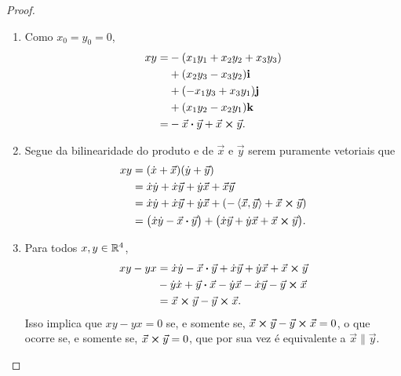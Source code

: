 \begin{proof}
\begin{enumerate}
	\item Como $x_0=y_0=0$,
	\begin{align*}
	xy =& -(x_1y_1 + x_2y_2 + x_3y_3) \\
			&+ (x_2y_3-x_3y_2)\bm{\mathrm{i}} \\
			&+ (-x_1y_3+x_3y_1)\bm{\mathrm{j}} \\
			&+ (x_1y_2-x_2y_1)\bm{\mathrm{k}} \\
		=& - {\vec{x}} \bm{\cdot} {\vec{y}} + {\vec{x}} \bm{\times} {\vec{y}}.
	\end{align*}

	\item Segue da bilinearidade do produto e de $\vec{x}$ e $\vec{y}$ serem puramente vetoriais que
	\begin{align*}
	xy &= (\dot{x}+\vec{x})(\dot{y}+\vec{y}) \\
		&= \dot{x}\dot{y}+\dot{x}\vec{y}+\dot{y}\vec{x}+\vec{x}\vec{y} \\
		&= \dot{x}\dot{y}+\dot{x}\vec{y}+\dot{y}\vec{x}+(-\left\langle{\vec{x}},{\vec{y}}\right\rangle + {\vec{x}} \bm{\times} {\vec{y}}) \\
		&= \big(\dot{x}\dot{y} - {\vec{x}} \bm{\cdot} {\vec{y}}\big) + \big(\dot{x}\vec{y}+\dot{y}\vec{x}+{\vec{x}} \bm{\times} {\vec{y}} \big).
	\end{align*}
	
	\item Para todos $x,y \in \mathbb{R}^4$,
		\begin{align*}
		xy - yx &= \dot{x}\dot{y} - {\vec{x}} \bm{\cdot} {\vec{y}}+\dot{x}\vec{y}+\dot{y}\vec{x}+{\vec{x}} \bm{\times} {\vec{y}} \\
			&- \dot{y}\dot{x} + {\vec{y}} \bm{\cdot} {\vec{x}}-\dot{y}\vec{x}-\dot{x}\vec{y}-{\vec{y}} \bm{\times} {\vec{x}} \\
			&={\vec{x}} \bm{\times} {\vec{y}} - {\vec{y}} \bm{\times} {\vec{x}}.
		\end{align*}
Isso implica que $xy-yx=0$ se, e somente se, ${\vec{x}} \bm{\times} {\vec{y}} - {\vec{y}} \bm{\times} {\vec{x}}=0$, o que ocorre se, e somente se, ${\vec{x}} \bm{\times} {\vec{y}}=0$, que por sua vez é equivalente a $\vec{x} \parallel \vec{y}$.


\end{enumerate}
\end{proof}
